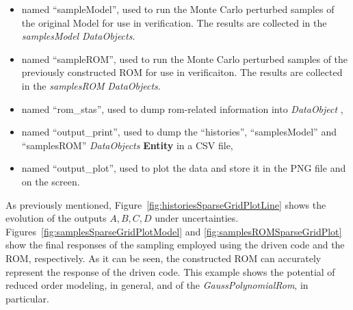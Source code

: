 \begin{enumerate}
\begin{itemize}
     \item {} named ``sampleModel'', used to run the
     Monte Carlo perturbed samples of the original Model for use in verification.  The results are
     collected in the \textit{samplesModel} \textit{DataObjects}.
     \item {} named ``sampleROM'', used to run the
     Monte Carlo perturbed samples of the previously constructed ROM for use in verificaiton.  The results are
     collected in the \textit{samplesROM} \textit{DataObjects}.
     \item {} named ``rom\_stas'', used to dump rom-related information into \textit{DataObject },
     \item  {} named ``output\_print'', used to dump
     the ``histories'', ``samplesModel'' and ``samplesROM'' \textit{DataObjects}
     \textbf{Entity} in a CSV file,
     \item  {} named ``output\_plot'', used to
     plot the data and store it in the PNG file and
     on the screen.
   \end{itemize}
\end{enumerate}
 As previously mentioned, Figure~\ref{fig:historiesSparseGridPlotLine}
 shows the evolution of the outputs $A,B,C,D$ under uncertainties.
 Figures~\ref{fig:samplesSparseGridPlotModel} and
 \ref{fig:samplesROMSparseGridPlot} show the final responses
 of the sampling employed using the driven code and the ROM,
 respectively. As it can be seen, the constructed ROM can accurately
 represent the response of the driven code. This example shows the
 potential of reduced order modeling, in general, and of the
 \textit{GaussPolynomialRom}, in particular.

